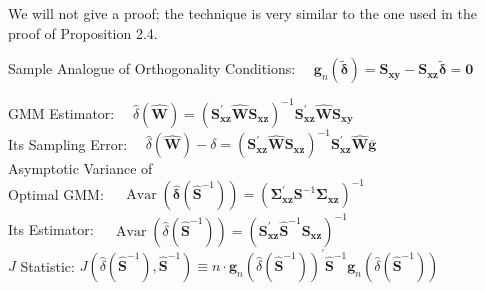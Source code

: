 \documentclass[10pt]{article}
\begin{document}
We will not give a proof; the technique is very similar to the one used in the proof of Proposition 2.4.

Sample Analogue of Orthogonality Conditions: $\quad \mathbf{g}_{n}(\tilde{\boldsymbol{\delta}})=\mathbf{S}_{\mathbf{x y}}-\mathbf{S}_{\mathbf{x z}} \tilde{\boldsymbol{\delta}}=\mathbf{0}$

GMM Estimator: $\quad \hat{\delta}(\widehat{\mathbf{W}})=\left(\mathbf{S}_{\mathbf{x z}}^{\prime} \widehat{\mathbf{W}} \mathbf{S}_{\mathbf{x z}}\right)^{-1} \mathbf{S}_{\mathbf{x z}}^{\prime} \widehat{\mathbf{W}} \mathbf{S}_{\mathbf{x y}}$\\
Its Sampling Error: $\quad \hat{\delta}(\widehat{\mathbf{W}})-\delta=\left(\mathbf{S}_{\mathbf{x z}}^{\prime} \widehat{\mathbf{W}} \mathbf{S}_{\mathbf{x z}}\right)^{-1} \mathbf{S}_{\mathbf{x z}}^{\prime} \widehat{\mathbf{W}} \overline{\mathbf{g}}$\\
Asymptotic Variance of\\
Optimal GMM: $\quad \operatorname{Avar}\left(\hat{\boldsymbol{\delta}}\left(\widehat{\mathbf{S}}^{-1}\right)\right)=\left(\boldsymbol{\Sigma}_{\mathbf{x z}}^{\prime} \mathbf{S}^{-1} \boldsymbol{\Sigma}_{\mathbf{x z}}\right)^{-1}$\\
Its Estimator: $\quad \widehat{\operatorname{Avar}\left(\hat{\delta}\left(\widehat{\mathbf{S}}^{-1}\right)\right)}=\left(\mathbf{S}_{\mathbf{x z}}^{\prime} \widehat{\mathbf{S}}^{-1} \mathbf{S}_{\mathbf{x z}}\right)^{-1}$\\
$J$ Statistic: $J\left(\hat{\delta}\left(\widehat{\mathbf{S}}^{-1}\right), \widehat{\mathbf{S}}^{-1}\right) \equiv n \cdot \mathbf{g}_{n}\left(\hat{\delta}\left(\widehat{\mathbf{S}}^{-1}\right)\right)^{\prime} \widehat{\mathbf{S}}^{-1} \mathbf{g}_{n}\left(\hat{\delta}\left(\widehat{\mathbf{S}}^{-1}\right)\right)$
\end{document}
